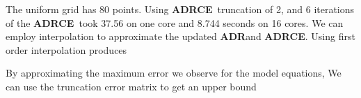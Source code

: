 \documentclass[12pt]{article}
\newcommand{\ADRCE}{{\bf ADRCE}}
\newcommand{\ADR}{{\bf ADR}}
\begin{document}


The uniform grid has 80 points.
Using  \ADRCE\ truncation of 2, and 6 iterations of the \ADRCE\ took
37.56 on one core and 8.744 seconds on 16 cores.
We can employ interpolation to approximate the updated \ADR and \ADRCE.  
Using first order interpolation produces 

By approximating the maximum error we observe for the model equations,
We can use the truncation error matrix to get an upper bound



















\end{document}
